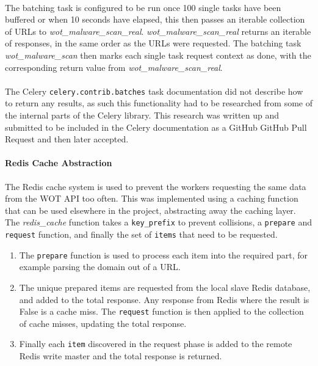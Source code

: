 \paragraph{}
The batching task is configured to be run once 100 single tasks have been buffered or when 10 seconds have elapsed, this then passes an iterable collection of URLs to \emph{wot\_malware\_scan\_real}. \emph{wot\_malware\_scan\_real} returns an iterable of responses, in the same order as the URLs were requested. The batching task \emph{wot\_malware\_scan} then marks each single task request context as done, with the corresponding return value from \emph{wot\_malware\_scan\_real}\cite{celery-batches}.

\paragraph{}
The Celery \verb`celery.contrib.batches` task documentation did not describe how to return any results, as such this functionality had to be researched from some of the internal parts of the Celery library.  This research was written up and submitted to be included in the Celery documentation as a GitHub GitHub Pull Request and then later accepted\cite{celery-batches-docfix}.

\paragraph{Redis Cache Abstraction}
The Redis cache system is used to prevent the workers requesting the same data from the WOT API too often.  This was implemented using a caching function that can be used elsewhere in the project, abstracting away the caching layer.  The \emph{redis\_cache} function takes a \verb`key_prefix` to prevent collisions, a \verb`prepare` and \verb`request` function, and finally the set of \verb`items` that need to be requested.

\begin{enumerate}
    \item The \verb`prepare` function is used to process each item into the required part, for example parsing the domain out of a URL.

    \item The unique prepared items are requested from the local slave Redis database, and added to the total response. Any response from Redis where the result is False is a cache miss. The \verb`request` function is then applied to the collection of cache misses, updating the total response.

    \item Finally each \verb`item` discovered in the request phase is added to the remote Redis write master and the total response is returned.
\end{enumerate}

